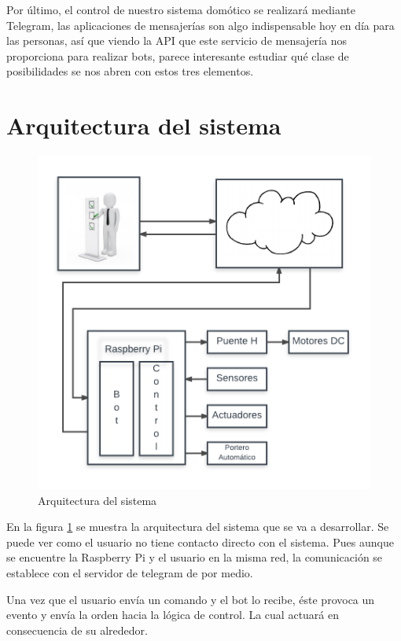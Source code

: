 \documentclass[10pt,journal,compsoc]{IEEEtran}
\begin{document}
Por último, el control de nuestro sistema domótico se realizará mediante Telegram, las aplicaciones 
de mensajerías son algo indispensable hoy en día para las personas, así que viendo la API que este 
servicio de mensajería nos proporciona para realizar bots, parece interesante estudiar qué clase de 
posibilidades se nos abren con estos tres elementos.

\section{Arquitectura del sistema}
\begin{figure}[h]
\centering
\includegraphics[scale=0.5]{ArqSist}
\caption{Arquitectura del sistema}
\label{fig:arqSist}
\end{figure}

En la figura \ref{fig:arqSist} se muestra la arquitectura del sistema que se va a desarrollar. 
Se puede ver como el usuario no tiene contacto directo con el sistema. Pues aunque se encuentre la 
Raspberry Pi y el usuario en la misma red, la comunicación se establece con el servidor de telegram 
de por medio.

Una vez que el usuario envía un comando y el bot lo recibe, éste provoca un evento y envía 
la orden hacia la lógica de control. La cual actuará en consecuencia de su alrededor.
\end{document}
